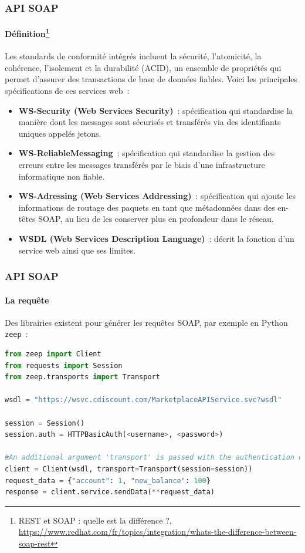 \documentclass{beamer}
\begin{document}
    \begin{frame}[fragile]
        \transdissolve
        \frametitle{API SOAP}
        \framesubtitle{Définition\footnote{REST et SOAP : quelle est la différence ?, \url{https://www.redhat.com/fr/topics/integration/whats-the-difference-between-soap-rest}}}
        \begin{footnotesize}
            Les standards de conformité intégrés incluent la sécurité, l'atomicité, la cohérence, l'isolement et la durabilité (ACID), un ensemble de propriétés qui permet d'assurer des transactions de base de données fiables.
            Voici les principales spécifications de ces services web~:
            \begin{itemize}
                \item \textbf{WS-Security (Web Services Security)}~: spécification qui standardise la manière dont les messages sont sécurisés et transférés via des identifiants uniques appelés jetons.
                \item \textbf{WS-ReliableMessaging}~: spécification qui standardise la gestion des erreurs entre les messages transférés par le biais d'une infrastructure informatique non fiable.
                \item \textbf{WS-Adressing (Web Services Addressing)}~: spécification qui ajoute les informations de routage des paquets en tant que métadonnées dans des en-têtes SOAP, au lieu de les conserver plus en profondeur dans le réseau.
                \item \textbf{WSDL (Web Services Description Language)}~: décrit la fonction d'un service web ainsi que ses limites.
            \end{itemize}
        \end{footnotesize}
    \end{frame}

    \begin{frame}[fragile]
        \transdissolve
        \frametitle{API SOAP}
        \framesubtitle{La requête}
        Des librairies existent pour générer les requêtes SOAP, par exemple en Python \lstinline{zeep}~:
        \begin{lstlisting}[language=python,basicstyle=\ttfamily\tiny]
from zeep import Client
from requests import Session
from zeep.transports import Transport

wsdl = "https://wsvc.cdiscount.com/MarketplaceAPIService.svc?wsdl"

session = Session()
session.auth = HTTPBasicAuth(<username>, <password>)

#An additional argument 'transport' is passed with the authentication details
client = Client(wsdl, transport=Transport(session=session))
request_data = {"account": 1, "new_balance": 100}
response = client.service.sendData(**request_data)
        \end{lstlisting}
    \end{frame}
\end{document}
